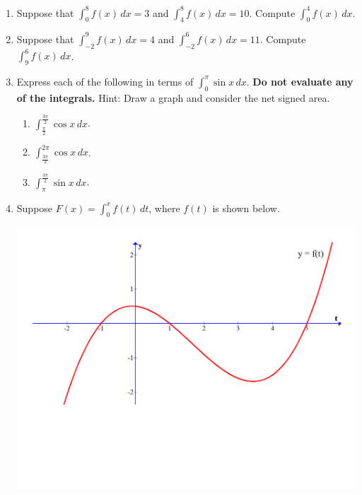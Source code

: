 \documentclass[12pt]{article}
\newif\ifans
\begin{document}
\begin{enumerate}
\ifans{\fbox{$-26$}} \fi

\item Suppose that $\int_0^8{f(x)} \,dx=3$ and $\int_4^{8}{f(x)} \,dx=10$.  Compute $\int_0^4{f(x)} \,dx$.

\ifans{\fbox{$-7$}} \fi

\item Suppose that $\int_{-2}^9{f(x)} \,dx=4$ and $\int_{-2}^{6}{f(x)} \,dx=11$.  Compute $\int_{9}^6{f(x)} \,dx$.

\ifans{\fbox{$7$}} \fi

\item Express each of the following in terms of $\int_0^{\pi}\sin{x} \,dx$.  {\bf Do not evaluate any of the integrals.}  Hint: Draw a graph and consider the net signed area.

\begin{enumerate}

\item $\int_{\frac{\pi}{2}}^{\frac{3\pi}{2}}\cos{x} \,dx$.

\ifans{\fbox{$\int_{\frac{\pi}{2}}^{\frac{3\pi}{2}}\cos{x} \,dx=-\int_0^{\pi}\sin{x} \,dx$}} \fi

\item $\int_{\frac{3\pi}{2}}^{2\pi}\cos{x} \,dx$.

\ifans{\fbox{$\int_{\frac{3\pi}{2}}^{2\pi}\cos{x} \,dx=\frac{1}{2}\int_0^{\pi}\sin{x} \,dx$}} \fi

\item $\int_{\pi}^{\frac{3\pi}{2}}\sin{x} \,dx$.

\ifans{\fbox{$\int_{\pi}^{\frac{3\pi}{2}}\sin{x} \,dx=-\frac{1}{2}\int_0^{\pi}\sin{x} \,dx$}} \fi

\end{enumerate}

\item Suppose $F(x)=\int_0^x{f(t)} \,dt$, where $f(t)$ is shown below.

\hspace{2cm} \includegraphics[scale=0.5]{graph2.pdf}


\end{enumerate}
\end{document}
